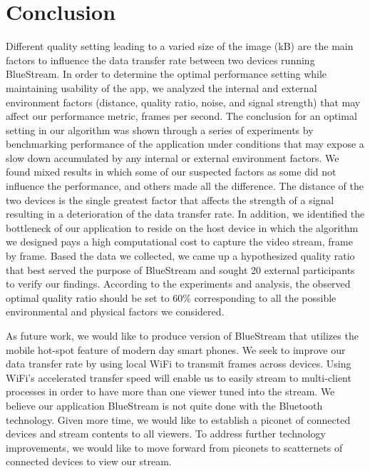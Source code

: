 \documentclass[a4paper,12pt]{article}
\begin{document}
\section{Conclusion}
Different quality setting leading to a varied size of the image (kB) are the main factors to influence the data transfer rate between two devices running BlueStream. In order to determine the optimal performance setting while maintaining usability of the app, we analyzed the internal and external environment factors (distance, quality ratio, noise, and signal strength) that may affect our performance metric, frames per second. The conclusion for an optimal setting in our algorithm was shown through a series of experiments by benchmarking performance of the application under conditions that may expose a slow down accumulated by any internal or external environment factors. We found mixed results in which some of our suspected factors as some did not influence the performance, and others made all the difference. The distance of the two devices is the single greatest factor that affects the strength of a signal  resulting in a deterioration of the data transfer rate. In addition, we identified the bottleneck of our application to reside on the host device in which the algorithm we designed pays a high computational cost to capture the video stream, frame by frame. Based the data we collected, we came up a hypothesized quality ratio that best served the purpose of BlueStream and sought 20 external participants to verify our findings. According to the experiments and analysis, the observed optimal quality ratio should be set to 60\% corresponding to all the possible environmental and physical factors we considered.

As future work, we would like to produce version of BlueStream that utilizes the mobile hot-spot feature of modern day smart phones. We seek to improve our data transfer rate by using local WiFi to transmit frames across devices. Using WiFi's accelerated transfer speed will enable us to easily stream to multi-client processes in order to have more than one viewer tuned into the stream. We believe our application BlueStream is not quite done with the Bluetooth technology. Given more time, we would like to establish a piconet of connected devices and stream contents to all viewers. To address further technology improvements, we would like to move forward from piconets to scatternets of connected devices to view our stream.  


\newpage
\end{document}
